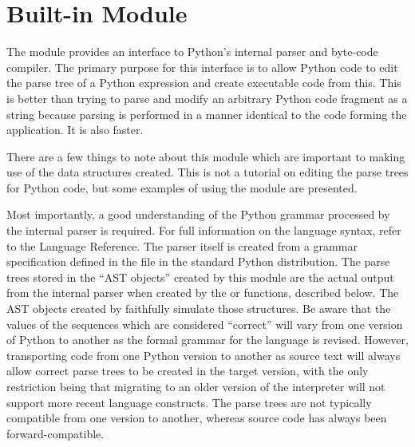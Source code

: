 %
%

\section{Built-in Module }
\label{module-parser}

The  module provides an interface to Python's internal
parser and byte-code compiler.  The primary purpose for this interface
is to allow Python code to edit the parse tree of a Python expression
and create executable code from this.  This is better than trying
to parse and modify an arbitrary Python code fragment as a string
because parsing is performed in a manner identical to the code
forming the application.  It is also faster.

There are a few things to note about this module which are important
to making use of the data structures created.  This is not a tutorial
on editing the parse trees for Python code, but some examples of using
the  module are presented.

Most importantly, a good understanding of the Python grammar processed
by the internal parser is required.  For full information on the
language syntax, refer to the Language Reference.  The parser itself
is created from a grammar specification defined in the file
 in the standard Python distribution.  The parse
trees stored in the ``AST objects'' created by this module are the
actual output from the internal parser when created by the
 or  functions, described below.  The AST
objects created by  faithfully simulate those
structures.  Be aware that the values of the sequences which are
considered ``correct'' will vary from one version of Python to another
as the formal grammar for the language is revised.  However,
transporting code from one Python version to another as source text
will always allow correct parse trees to be created in the target
version, with the only restriction being that migrating to an older
version of the interpreter will not support more recent language
constructs.  The parse trees are not typically compatible from one
version to another, whereas source code has always been
forward-compatible.

